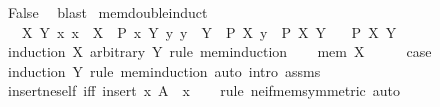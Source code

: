 \begin{isabellebody}
\ False\ \isamarkupfalse%
\ blast\isanewline
{}\isamarkupfalse%
%
\endisatagproof
{\isafoldproof}%
%
\isadelimproof
\isanewline
%
\endisadelimproof
\isanewline
{}\isamarkupfalse%
\ mem{\isacharunderscore}{\kern0pt}double{\isacharunderscore}{\kern0pt}induct{\isacharcolon}{\kern0pt}\isanewline
\ \ \ {\isachardoublequoteopen}{\isasymAnd}X\ Y{\isachardot}{\kern0pt}\ {\isasymlbrakk}{\isasymAnd}x{\isachardot}{\kern0pt}\ x\ {\isasymin}\ X\ {\isasymLongrightarrow}\ P\ x\ Y{\isacharsemicolon}{\kern0pt}\ {\isasymAnd}y{\isachardot}{\kern0pt}\ y\ {\isasymin}\ Y\ {\isasymLongrightarrow}\ P\ X\ y{\isasymrbrakk}\ {\isasymLongrightarrow}\ P\ X\ Y{\isachardoublequoteclose}\isanewline
\ \ \ {\isachardoublequoteopen}P\ X\ Y{\isachardoublequoteclose}\isanewline
%
\isadelimproof
%
\endisadelimproof
%
\isatagproof
{}\isamarkupfalse%
\ {\isacharparenleft}{\kern0pt}induction\ X\ arbitrary{\isacharcolon}{\kern0pt}\ Y\ rule{\isacharcolon}{\kern0pt}\ mem{\isacharunderscore}{\kern0pt}induction{\isacharparenright}{\kern0pt}\isanewline
\ \ \isamarkupfalse%
\ {\isacharparenleft}{\kern0pt}mem\ X{\isacharparenright}{\kern0pt}\isanewline
\ \ \isamarkupfalse%
\ \isamarkupfalse%
\ {\isacharquery}{\kern0pt}case\ \isamarkupfalse%
\ {\isacharparenleft}{\kern0pt}induction\ Y\ rule{\isacharcolon}{\kern0pt}\ mem{\isacharunderscore}{\kern0pt}induction{\isacharparenright}{\kern0pt}\ {\isacharparenleft}{\kern0pt}auto\ intro{\isacharcolon}{\kern0pt}\ assms{\isacharparenright}{\kern0pt}\isanewline
{}\isamarkupfalse%
%
\endisatagproof
{\isafoldproof}%
%
\isadelimproof
\isanewline
%
\endisadelimproof
\isanewline
{}\isamarkupfalse%
\ insert{\isacharunderscore}{\kern0pt}ne{\isacharunderscore}{\kern0pt}self\ {\isacharbrackleft}{\kern0pt}iff{\isacharbrackright}{\kern0pt}{\isacharcolon}{\kern0pt}\ {\isachardoublequoteopen}insert\ x\ A\ {\isasymnoteq}\ x{\isachardoublequoteclose}\isanewline
%
\isadelimproof
\ \ %
\endisadelimproof
%
\isatagproof
{}\isamarkupfalse%
\ {\isacharparenleft}{\kern0pt}rule\ ne{\isacharunderscore}{\kern0pt}if{\isacharunderscore}{\kern0pt}mem{\isacharbrackleft}{\kern0pt}symmetric{\isacharbrackright}{\kern0pt}{\isacharparenright}{\kern0pt}\ auto%
\endisatagproof
{\isafoldproof}%
%
\isadelimproof
\isanewline
%
\endisadelimproof
\isanewline
%
\isadelimtheory
\isanewline
%
\endisadelimtheory
%
\isatagtheory
{}\isamarkupfalse%
%
\endisatagtheory
{\isafoldtheory}%
%
\isadelimtheory
%
\endisadelimtheory
%
\end{isabellebody}%
